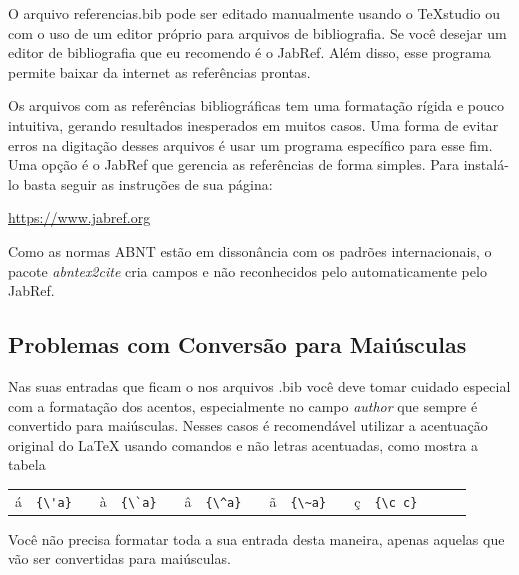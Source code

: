 \begin{apendicesenv}
    O arquivo {\color{red} referencias.bib} pode ser editado manualmente usando o
    TeXstudio ou com o uso de um editor próprio para arquivos de bibliografia.
    Se você desejar um editor de bibliografia que eu recomendo é o JabRef.
    Além disso, esse programa permite baixar da internet as referências prontas.

    Os arquivos com as referências bibliográficas tem uma formatação rígida e pouco intuitiva, gerando resultados inesperados em muitos casos. Uma forma de evitar erros na digitação desses arquivos é usar um programa específico para esse fim. Uma opção é o JabRef que gerencia as referências de forma simples. Para instalá-lo basta seguir as instruções de sua página:
    \begin{center}
        \url{https://www.jabref.org}
    \end{center}

    Como as normas ABNT estão em dissonância com os padrões internacionais,
    o pacote \textit{abntex2cite} cria campos e não reconhecidos pelo automaticamente
    pelo JabRef.

    \subsection{Problemas com Conversão para Maiúsculas}

    Nas suas entradas que ficam o nos arquivos {\color{red} .bib}
    você deve tomar cuidado especial com a formatação dos acentos,
    especialmente no campo \textit{author} que sempre é convertido para maiúsculas.
    Nesses casos é recomendável utilizar a acentuação original do \LaTeX{}
    usando comandos e não letras acentuadas, como mostra a tabela

    \begin{center}
        \begin{tabular}{clcclcclcclcclccl}
            á & \verb!{\'a}! &  &
            à & \verb!{\`a}! &  &
            â & \verb!{\^a}! &  &
            ã & \verb!{\~a}! &  &
            ç & \verb!{\c c}!
        \end{tabular}
    \end{center}

    Você não precisa formatar toda a sua entrada desta maneira,
    apenas aquelas que vão ser convertidas para maiúsculas.

\end{apendicesenv}
